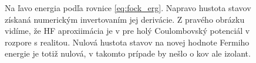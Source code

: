 \documentclass[
	11pt, %
]{beamer}
\begin{document}
\begin{frame}
\begin{figure}
    \vspace{-10mm}
    \small
    \caption{Na ľavo energia podľa rovnice \eqref{eq:fock_erg}.  Napravo hustota stavov získaná numerickým invertovaním jej derivácie. Z pravého obrázku vidíme, že HF aproxiimácia je v pre holý Coulombovský potenciál v rozpore s realitou. Nulová hustota stavov na novej hodnote Fermiho energie je totiž nulová, v takomto prípade by nešlo o kov ale izolant.}%
    \normalsize
    \label{fig:example}%
\end{figure}
\end{frame}
\end{document}
